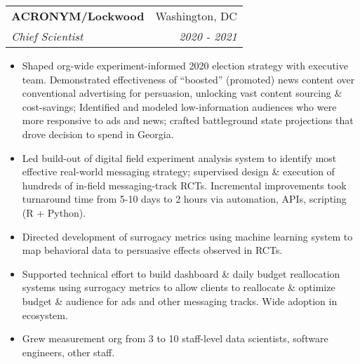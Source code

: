 \documentclass[letterpaper,11pt]{article}
\makeatletter
\newcommand{\resitem}[1]{\item #1 \vspace{-6pt}}
\newcommand{\ressubheading}[4]{\vspace{2pt}
\begin{tabular*}{7.58in}{l@{\extracolsep{\fill}}r}
		\textbf{#1} & #2 \\
		\textit{#3} & \textit{#4} \\
\end{tabular*}\vspace{-1pt}}
\makeatother
\begin{document}
\ressubheading{ACRONYM/Lockwood}{Washington, DC}{Chief Scientist}{2020 - 2021}
	\begin{itemize}
       	 	\resitem{Shaped org-wide experiment-informed 2020 election strategy with executive team. Demonstrated effectiveness of ``boosted'' (promoted) news content over conventional advertising for persuasion, unlocking vast content sourcing \& cost-savings; Identified and modeled low-information audiences who were more responsive to ads and news; crafted battleground state projections that drove decision to spend in Georgia.}
		\resitem{Led build-out of digital field experiment analysis system to identify most effective real-world messaging strategy; supervised design \& execution of hundreds of in-field messaging-track RCTs. Incremental improvements took turnaround time from 5-10 days to 2 hours via automation, APIs, scripting (R + Python).}
		\resitem{Directed development of surrogacy metrics using machine learning system to map behavioral data to persuasive effects observed in RCTs.} 
		\resitem{Supported technical effort to build dashboard \& daily budget reallocation systems using surrogacy metrics to allow clients to reallocate \& optimize budget \& audience for ads and other messaging tracks. Wide adoption in ecosystem.}
		\resitem{Grew measurement org from 3 to 10 staff-level data scientists, software engineers, other staff.}
	\end{itemize}
\end{document}
